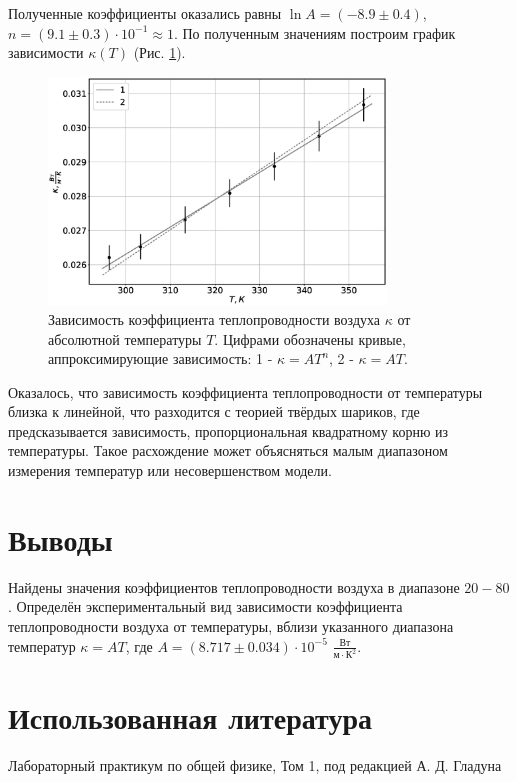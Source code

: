 \documentclass[12pt]{article}
\begin{document}
Полученные коэффициенты оказались равны \(\ln A = (-8.9 \pm 0.4)\), \(n = (9.1 \pm 0.3) \cdot 10 ^ {-1} \approx 1\). По полученным значениям 
построим график зависимости \(\kappa (T)\) (Рис. \ref{fig:kT}).  
\begin{figure}[H]
    \centering
    \includegraphics[width=0.8\textwidth]{kT.eps}
    \caption{Зависимость коэффициента теплопроводности воздуха \(\kappa \) от абсолютной температуры \(T\). Цифрами обозначены кривые, аппроксимирующие
        зависимость: 1 - \(\kappa = A T^n\), 2 - \(\kappa = A T\).}
    \label{fig:kT}
\end{figure}

Оказалось, что зависимость коэффициента теплопроводности от температуры близка к линейной, что разходится с теорией
твёрдых шариков, где предсказывается зависимость, пропорциональная квадратному корню из температуры. 
Такое расхождение может объясняться малым диапазоном измерения температур или несовершенством модели.

\section{Выводы}
Найдены значения коэффициентов теплопроводности воздуха в диапазоне \(20 - 80\) \textcelsius. Определён 
экспериментальный вид зависимости коэффициента теплопроводности воздуха от температуры, вблизи указанного 
диапазона температур \(\kappa = A T\), где \(A = (8.717 \pm 0.034) \cdot 10 ^ {-5}\) \(\frac{\textrm{Вт}}{\textrm{м} \cdot \textrm{К}^2}\).

\section{Использованная литература}
\begin{thebibliography}{9}
    Лабораторный практикум по общей физике, Том 1, под редакцией А. Д. Гладуна
\end{thebibliography}
\end{document}
